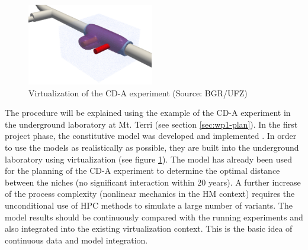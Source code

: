 \begin{figure}
\vspace{-5mm}
\centering
\includegraphics[width=0.49\textwidth]{figures/cd-a}
\caption{Virtualization of the CD-A experiment (Source: BGR/UFZ)}
\label{fig:cd-a}
\end{figure}
The procedure will be explained using the example of the CD-A experiment in the underground laboratory at Mt. Terri (see section \ref{sec:wp1-plan}). In the first project phase, the constitutive model was developed and implemented \cite{Vowinckel2019}. In order to use the models as realistically as possible, they are built into the underground laboratory using virtualization (see figure \ref{fig:cd-a}). The model has already been used for the planning of the CD-A experiment to determine the optimal distance between the niches (no significant interaction within 20 years). A further increase of the process complexity (nonlinear mechanics in the HM context) requires the unconditional use of HPC methods to simulate a large number of variants. The model results should be continuously compared with the running experiments and also integrated into the existing virtualization context. This is the basic idea of continuous data and model integration.


